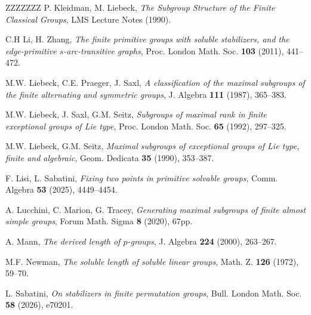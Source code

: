 \documentclass[11pt]{amsart}
\numberwithin{equation}{section}
\theoremstyle{definition}
\theoremstyle{remark}
\begin{document}
\begin{thebibliography}{ZZZZZZZ}
 P. Kleidman, M. Liebeck,
\textit{The Subgroup Structure of the Finite Classical Groups},
LMS Lecture Notes (1990).

 C.H Li, H. Zhang,
\textit{The finite primitive groups with soluble stabilizers, and the edge-primitive $s$-arc-transitive graphs},
Proc. London Math. Soc. \textbf{103} (2011), 441--472.

 M.W. Liebeck, C.E. Praeger, J. Saxl,
\textit{A classification of the maximal subgroups of the finite alternating and symmetric groups},
J. Algebra \textbf{111} (1987), 365--383.

 M.W. Liebeck, J. Saxl, G.M. Seitz,
\textit{Subgroups of maximal rank in finite exceptional groups of Lie type},
Proc. London Math. Soc. \textbf{65} (1992), 297--325.

 M.W. Liebeck, G.M. Seitz,
\textit{Maximal subgroups of exceptional groups of Lie type, finite and algebraic},
Geom. Dedicata \textbf{35} (1990), 353--387.

 F. Lisi, L. Sabatini,
\textit{Fixing two points in primitive solvable groups},
Comm. Algebra \textbf{53} (2025), 4449--4454.

 A. Lucchini, C. Marion, G. Tracey,
\textit{Generating maximal subgroups of finite almost simple groups},
Forum Math. Sigma \textbf{8} (2020), 67pp.

 A. Mann,
\textit{The derived length of $p$-groups},
J. Algebra \textbf{224} (2000), 263--267.

 M.F. Newman,
\textit{The soluble length of soluble linear groups},
Math. Z. \textbf{126} (1972), 59--70.

 L. Sabatini,
\textit{On stabilizers in finite permutation groups},
Bull. London Math. Soc. \textbf{58} (2026), e70201.

   \end{thebibliography}
   
   \vspace{0.5cm}
\end{document}
